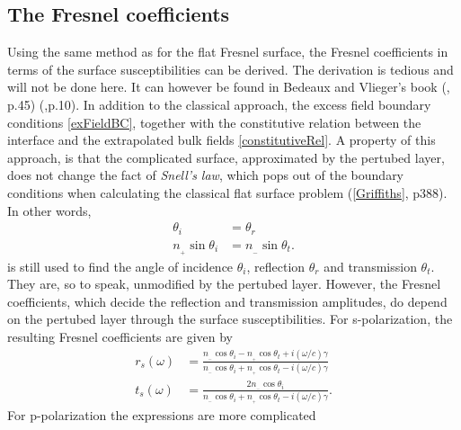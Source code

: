 \subsection{The Fresnel coefficients}
Using the same method as for the flat Fresnel surface, the Fresnel coefficients in terms of the surface
susceptibilities can be derived. The derivation is tedious and will not be done here. It can however
be found in Bedeaux and Vlieger's book (\cite{BedeauxVliegerBook}, p.45)  (\cite{LieMaster2010},p.10).
In addition to the classical approach, the excess field boundary conditions \eqref{exFieldBC},
together with the constitutive relation between the interface 
and the extrapolated bulk fields \eqref{constitutiveRel}.
A property of this approach, is that the complicated surface, approximated by the pertubed layer,
does not change the fact of \textit{Snell's law}, which pops out of the boundary conditions
when calculating the classical flat surface problem (\eqref{Griffiths}, p388). In other words, 
\begin{subequations}
\label{snellsLaw}
\begin{align}
   \theta_i &= \theta_r \label{snellsLaw1}\\
   n_{_+} \sin \theta_i &= n_{_-} \sin \theta_t. \label{snellsLaw2}
\end{align}
\end{subequations}
is still used to find the angle of incidence $\theta_i$, reflection $\theta_r$ and transmission $\theta_t$.
They are, so to speak, unmodified by the pertubed layer. However, the Fresnel coefficients, which
decide the reflection and transmission amplitudes, do depend on the pertubed layer through 
the surface susceptibilities. For s-polarization, the resulting Fresnel coefficients are given by
\begin{subequations}
   \label{fresCoeffS}
\begin{align}
   r_s(\omega) &= \frac{n\!_{_-} \cos \theta_i - n\!_{_+} \cos \theta_t + i(\omega/c) \gamma}{n\!_{_-} \cos \theta_i + n\!_{_+} \cos \theta_t - i(\omega/c) \gamma} \label{fresCoeffS1} \\
   t_s(\omega) &= \frac{2 n\!_{_-} \cos \theta_i}{n\!_{_-} \cos \theta_i + n\!_{_+} \cos \theta_t - i(\omega/c) \gamma}. \label{fresCoeffS2}
\end{align}
\end{subequations}
%
For p-polarization the expressions are more complicated
%
